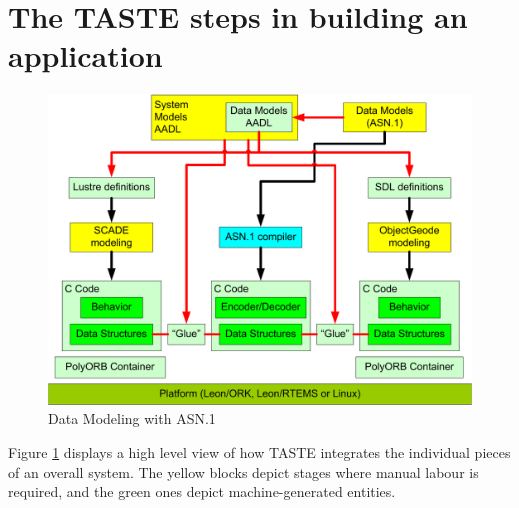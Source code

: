 \documentclass[11pt]{book}
\begin{document}
\section{The TASTE steps in building an application}
\label{assertProcess}
\begin{figure}[ht]
\centering
\includegraphics[width=13cm]{imgs/diagram}
\caption{Data Modeling with ASN.1}
\label{diagram}
\end{figure}
Figure \ref{diagram} displays a high level view of how TASTE integrates the individual
pieces of an overall system. The yellow blocks depict stages where manual labour
is required, and the green ones depict machine-generated entities.
\end{document}
